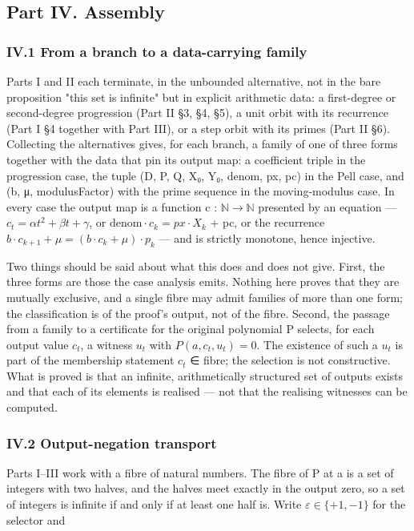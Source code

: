 \subsection*{Part IV. Assembly}
\subsubsection*{IV.1 From a branch to a data-carrying family}
Parts I and II each terminate, in the unbounded alternative, not in the bare proposition "this set is infinite" but in explicit arithmetic data: a first-degree or second-degree progression (Part II §3, §4, §5), a unit orbit with its recurrence (Part I §4 together with Part III), or a step orbit with its primes (Part II §6). Collecting the alternatives gives, for each branch, a family of one of three forms together with the data that pin its output map: a coefficient triple in the progression case, the tuple (D, P, Q, X₀, Y₀, denom, px, pc) in the Pell case, and (b, μ, modulusFactor) with the prime sequence in the moving-modulus case. In every case the output map is a function c : $ℕ → ℕ$ presented by an equation — $c_{t} = αt^{2} + βt + γ$, or $\mathrm{denom}·c_{k} = px·X_{k}$ + pc, or the recurrence $b·c_{k+1} + μ = (b·c_{k} + μ)·p_{k}$ — and is strictly monotone, hence injective.

Two things should be said about what this does and does not give. First, the three forms are those the case analysis emits. Nothing here proves that they are mutually exclusive, and a single fibre may admit families of more than one form; the classification is of the proof's output, not of the fibre. Second, the passage from a family to a certificate for the original polynomial P selects, for each output value $c_{t}$, a witness $u_{t}$ with $P(a, c_{t}, u_{t}) = 0$. The existence of such a $u_{t}$ is part of the membership statement $c_{t}$ ∈ fibre; the selection is not constructive. What is proved is that an infinite, arithmetically structured set of outputs exists and that each of its elements is realised — not that the realising witnesses can be computed.

\subsubsection*{IV.2 Output-negation transport}
Parts I–III work with a fibre of natural numbers. The fibre of P at a is a set of integers with two halves, and the halves meet exactly in the output zero, so a set of integers is infinite if and only if at least one half is. Write $ε ∈ \{+1, −1\}$ for the selector and


